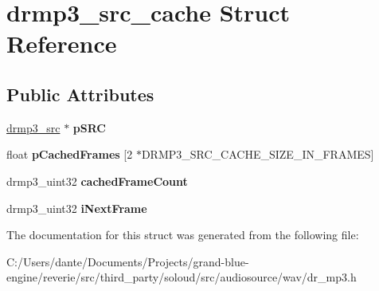 \hypertarget{structdrmp3__src__cache}{}\section{drmp3\+\_\+src\+\_\+cache Struct Reference}
\label{structdrmp3__src__cache}
\subsection*{Public Attributes}
\begin{DoxyCompactItemize}
\item 
\mbox{\label{structdrmp3__src__cache_a5fdf0458da475de0adc6dbc666fc1c26}} 
\mbox{\hyperlink{structdrmp3__src}{drmp3\+\_\+src}} $\ast$ {\bfseries p\+S\+RC}
\item 
\mbox{\label{structdrmp3__src__cache_afce1aa048258df1a15bce54c5a2b4312}} 
float {\bfseries p\+Cached\+Frames} \mbox{[}2 $\ast$D\+R\+M\+P3\+\_\+\+S\+R\+C\+\_\+\+C\+A\+C\+H\+E\+\_\+\+S\+I\+Z\+E\+\_\+\+I\+N\+\_\+\+F\+R\+A\+M\+ES\mbox{]}
\item 
\mbox{\label{structdrmp3__src__cache_ad87fdd76d67fff7043cbd76aabf84c73}} 
drmp3\+\_\+uint32 {\bfseries cached\+Frame\+Count}
\item 
\mbox{\label{structdrmp3__src__cache_a74dd8ca23787bfaef35cd7d1f8cd592c}} 
drmp3\+\_\+uint32 {\bfseries i\+Next\+Frame}
\end{DoxyCompactItemize}


The documentation for this struct was generated from the following file\+:\begin{DoxyCompactItemize}
\item 
C\+:/\+Users/dante/\+Documents/\+Projects/grand-\/blue-\/engine/reverie/src/third\+\_\+party/soloud/src/audiosource/wav/dr\+\_\+mp3.\+h\end{DoxyCompactItemize}
